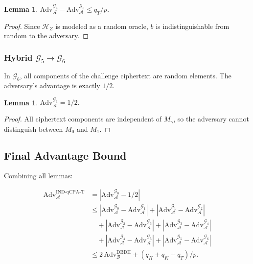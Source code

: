 \documentclass[lettersize,journal]{IEEEtran}
\newtheorem{lemma}[theorem]{Lemma}
\begin{document}
\begin{lemma}
\label{lem:g4_g5}
$\text{Adv}_{\mathcal{A}}^{\mathcal{G}_4} - \text{Adv}_{\mathcal{A}}^{\mathcal{G}_5} \leq q_T / p$.
\end{lemma}

\begin{proof}
Since $\mathcal{H}_Z$ is modeled as a random oracle, $b$ is indistinguishable from random to the adversary.
\end{proof}

\subsubsection{Hybrid $\mathcal{G}_5 \rightarrow \mathcal{G}_6$}

In $\mathcal{G}_6$, all components of the challenge ciphertext are random elements. The adversary's advantage is exactly $1/2$.

\begin{lemma}
\label{lem:g5_g6}
$\text{Adv}_{\mathcal{A}}^{\mathcal{G}_6} = 1/2$.
\end{lemma}

\begin{proof}
All ciphertext components are independent of $M_\gamma$, so the adversary cannot distinguish between $M_0$ and $M_1$.
\end{proof}

\subsection{Final Advantage Bound}

Combining all lemmas:

\begin{equation}
\begin{aligned}
\text{Adv}_{\mathcal{A}}^{\text{IND-qCPA-T}} &= |\text{Adv}_{\mathcal{A}}^{\mathcal{G}_0} - 1/2| \\
&\leq |\text{Adv}_{\mathcal{A}}^{\mathcal{G}_0} - \text{Adv}_{\mathcal{A}}^{\mathcal{G}_1}| + |\text{Adv}_{\mathcal{A}}^{\mathcal{G}_1} - \text{Adv}_{\mathcal{A}}^{\mathcal{G}_2}| \\
&\quad + |\text{Adv}_{\mathcal{A}}^{\mathcal{G}_2} - \text{Adv}_{\mathcal{A}}^{\mathcal{G}_3}| + |\text{Adv}_{\mathcal{A}}^{\mathcal{G}_3} - \text{Adv}_{\mathcal{A}}^{\mathcal{G}_4}| \\
&\quad + |\text{Adv}_{\mathcal{A}}^{\mathcal{G}_4} - \text{Adv}_{\mathcal{A}}^{\mathcal{G}_5}| + |\text{Adv}_{\mathcal{A}}^{\mathcal{G}_5} - \text{Adv}_{\mathcal{A}}^{\mathcal{G}_6}| \\
&\leq 2\,\text{Adv}_{\mathcal{B}}^{\text{DBDH}} + (q_H + q_K + q_T)/p.
\end{aligned}
\end{equation}
\end{document}

